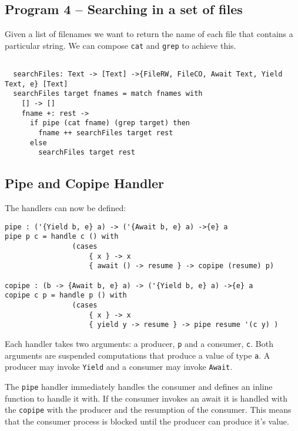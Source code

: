 \documentclass[logo,bsc,singlespacing,parskip]{infthesis}
\begin{document}
\begin{tcolorbox}[colback=gray!10, colframe=black, arc=0pt, outer arc=0pt]
  \section*{Program 4 -- Searching in a set of files}
  
  Given a list of filenames we want to return the name of each file that
  contains a particular string. We can compose \texttt{cat} and \texttt{grep}
  to achieve this.

  \begin{lstlisting}[language=unison]
  
  searchFiles: Text -> [Text] ->{FileRW, FileCO, Await Text, Yield Text, e} [Text]
  searchFiles target fnames = match fnames with 
    [] -> []
    fname +: rest -> 
      if pipe (cat fname) (grep target) then
        fname ++ searchFiles target rest
      else
        searchFiles target rest

  \end{lstlisting}
\end{tcolorbox}

\subsection{Pipe and Copipe Handler}

The handlers can now be defined:

\begin{lstlisting}[language=unison]
pipe : ('{Yield b, e} a) -> ('{Await b, e} a) ->{e} a
pipe p c = handle c () with
                (cases
                    { x } -> x
                    { await () -> resume } -> copipe (resume) p)

copipe : (b -> {Await b, e} a) -> ('{Yield b, e} a) ->{e} a
copipe c p = handle p () with
                (cases
                    { x } -> x
                    { yield y -> resume } -> pipe resume '(c y) )
\end{lstlisting}

Each handler takes two arguments: a producer, \texttt{p} and a consumer,
\texttt{c}. Both arguments are suspended computations that produce a value of
type \texttt{a}. A producer may invoke \texttt{Yield} and a consumer may invoke
\texttt{Await}.

The \texttt{pipe} handler immediately handles the consumer and defines an
inline function to handle it with. If the consumer invokes an await it is
handled with the \texttt{copipe} with the producer and the resumption of the
consumer. This means that the consumer process is blocked until the producer
can produce it's value.
\end{document}

